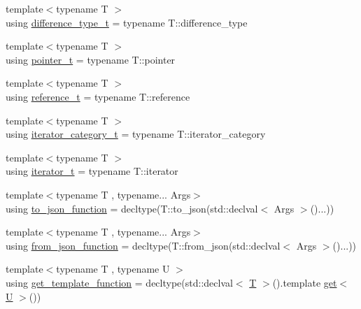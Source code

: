 \begin{DoxyCompactItemize}
\item 
{\footnotesize template$<$typename T $>$ }\\using \mbox{\hyperlink{namespacenlohmann_1_1detail_a3603b59a17d1c5e15050743b847992f2}{difference\+\_\+type\+\_\+t}} = typename T\+::difference\+\_\+type
\item 
{\footnotesize template$<$typename T $>$ }\\using \mbox{\hyperlink{namespacenlohmann_1_1detail_a26dc71e2dd9336587e56062178f9abce}{pointer\+\_\+t}} = typename T\+::pointer
\item 
{\footnotesize template$<$typename T $>$ }\\using \mbox{\hyperlink{namespacenlohmann_1_1detail_a082bdafd3b4c61d9d1e92b35b8f75ee3}{reference\+\_\+t}} = typename T\+::reference
\item 
{\footnotesize template$<$typename T $>$ }\\using \mbox{\hyperlink{namespacenlohmann_1_1detail_ad22d2aa3aab018050ae519f6754366e1}{iterator\+\_\+category\+\_\+t}} = typename T\+::iterator\+\_\+category
\item 
{\footnotesize template$<$typename T $>$ }\\using \mbox{\hyperlink{namespacenlohmann_1_1detail_a9ff93db146174305bce1bc4c54703e11}{iterator\+\_\+t}} = typename T\+::iterator
\item 
{\footnotesize template$<$typename T , typename... Args$>$ }\\using \mbox{\hyperlink{namespacenlohmann_1_1detail_af846b6cf2f926009ff3a7a61495ca383}{to\+\_\+json\+\_\+function}} = decltype(T\+::to\+\_\+json(std\+::declval$<$ Args $>$()...))
\item 
{\footnotesize template$<$typename T , typename... Args$>$ }\\using \mbox{\hyperlink{namespacenlohmann_1_1detail_a1711ee5cef66a0523055c8d9f024f322}{from\+\_\+json\+\_\+function}} = decltype(T\+::from\+\_\+json(std\+::declval$<$ Args $>$()...))
\item 
{\footnotesize template$<$typename T , typename U $>$ }\\using \mbox{\hyperlink{namespacenlohmann_1_1detail_ab4d22cdb6521ee3508db496dea66711e}{get\+\_\+template\+\_\+function}} = decltype(std\+::declval$<$ \mbox{\hyperlink{_keyboard_event_8h_adf1f3edb9115acb0a1e04209b7a9937b}{T}} $>$().template \mbox{\hyperlink{namespacenlohmann_1_1detail_acc422c11342b31368f610b6f96fcedc6}{get}}$<$ \mbox{\hyperlink{_keyboard_event_8h_a81cf6107131a3583e2b0b762cb9c2862}{U}} $>$())
\item 

\end{DoxyCompactItemize}
